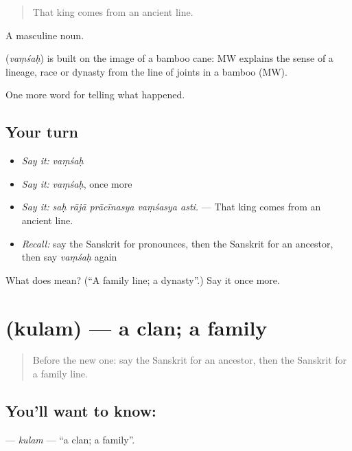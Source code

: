 \begin{quote}
That king comes from an ancient line.
\end{quote}

A masculine noun.

\begin{cousinweb}
\textbf{} (\emph{vaṃśaḥ}) is built on the image of a bamboo cane: MW explains the sense of a lineage, race or dynasty from the line of joints in a bamboo (MW).
\end{cousinweb}

\begin{grammarlens}[title={What you've built}]
One more word for telling what happened.
\end{grammarlens}

\subsection*{Your turn}
\begin{itemize}
\raggedright
  \item \emph{Say it:} \emph{vaṃśaḥ}
  \item \emph{Say it:} \emph{vaṃśaḥ}, once more
  \item \emph{Say it:} \emph{saḥ rājā prācīnasya vaṃśasya asti.} — That king comes from an ancient line.
  \item \emph{Recall:} say the Sanskrit for pronounces, then the Sanskrit for an ancestor, then say \emph{vaṃśaḥ} again
\end{itemize}

\begin{tcolorbox}[breakable,colback=teal!4,colframe=teal!35!black,title={Before you move on}]
What does  mean? (\textquotedblleft{}A family line; a dynasty\textquotedblright{}.) Say it once more.
\end{tcolorbox}
\section[\texorpdfstring{\sk{कुलम्} (kulam)}{कुलम् (kulam)}]{ (kulam) — a clan; a family}

\label{lesson:SA-C322-kulam}



\begin{quote}
Before the new one: say the Sanskrit for an ancestor, then the Sanskrit for a family line.
\end{quote}

\subsection*{You'll want to know: }
\textbf{} — \emph{kulam} — \textquotedblleft{}a clan; a family\textquotedblright{}.

